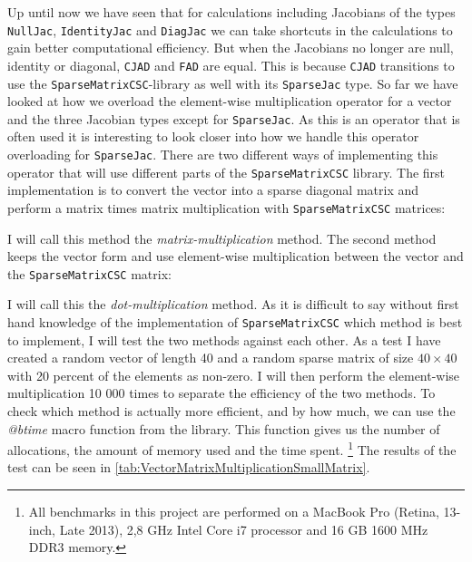 Up until now we have seen that for calculations including Jacobians of the types \texttt{NullJac}, \texttt{IdentityJac} and \texttt{DiagJac} we can take shortcuts in the calculations to gain better computational efficiency. But when the Jacobians no longer are null, identity or diagonal, \texttt{CJAD} and \texttt{FAD} are equal. This is because \texttt{CJAD} transitions to use the \texttt{SparseMatrixCSC}-library as well with its \texttt{SparseJac} type. So far we have looked at how we overload the element-wise multiplication operator for a vector and the three Jacobian types except for \texttt{SparseJac}. As this is an operator that is often used it is  interesting to look closer into how we handle this operator overloading for \texttt{SparseJac}. There are two different ways of implementing this operator that will use different parts of the \texttt{SparseMatrixCSC} library. The first implementation is to convert the vector into a sparse diagonal matrix and perform a matrix times matrix multiplication with \texttt{SparseMatrixCSC} matrices:

I will call this method the \textit{matrix-multiplication} method. The second method keeps the vector form and use element-wise multiplication between the vector and the \texttt{SparseMatrixCSC} matrix:

I will call this the \textit{dot-multiplication} method. As it is difficult to say without first hand knowledge of the implementation of \texttt{SparseMatrixCSC} which method is best to implement, I will test the two methods against each other. 
As a test I have created a random vector of length 40 and a random sparse matrix of size $40\times 40$ with 20 percent of the elements as non-zero. I will then perform the element-wise multiplication 10 000 times to separate the efficiency of the two methods. To check which method is actually more efficient, and by how much, we can use the \textit{@btime} macro function from the \emph{\cite{BenchmarkTools}} library. This function gives us the number of allocations, the amount of memory used and the time spent. \footnote{All benchmarks in this project are performed on a MacBook Pro (Retina, 13-inch, Late 2013), 2,8 GHz Intel Core i7 processor and 16 GB 1600 MHz DDR3 memory.}
The results of the test can be seen in \autoref{tab:VectorMatrixMultiplicationSmallMatrix}.
